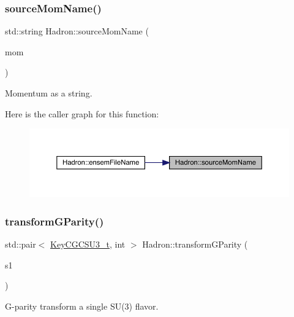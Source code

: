 \subsubsection{\texorpdfstring{sourceMomName()}{sourceMomName()}}
{\footnotesize\ttfamily std\+::string Hadron\+::source\+Mom\+Name (\begin{DoxyParamCaption}\item[{const \mbox{\hyperlink{classXMLArray_1_1Array}{Array}}$<$ int $>$ \&}]{mom }\end{DoxyParamCaption})}



Momentum as a string. 

Here is the caller graph for this function\+:
\nopagebreak
\begin{figure}[H]
\begin{center}
\leavevmode
\includegraphics[width=350pt]{d1/daf/namespaceHadron_addad39b9d17263485541d757bb712420_icgraph}
\end{center}
\end{figure}
\mbox{\label{namespaceHadron_ae0f88dc43657f9dd4f118d41608859cc}} 
\subsubsection{\texorpdfstring{transformGParity()}{transformGParity()}}
{\footnotesize\ttfamily std\+::pair$<$ \mbox{\hyperlink{structHadron_1_1KeyCGCSU3__t}{Key\+C\+G\+C\+S\+U3\+\_\+t}}, int $>$ Hadron\+::transform\+G\+Parity (\begin{DoxyParamCaption}\item[{const \mbox{\hyperlink{structHadron_1_1KeyCGCSU3__t}{Key\+C\+G\+C\+S\+U3\+\_\+t}} \&}]{s1 }\end{DoxyParamCaption})}



G-\/parity transform a single S\+U(3) flavor. 

\mbox{\label{namespaceHadron_ad5e2b22f66d2effe70db7f0ba129eae1}} 
